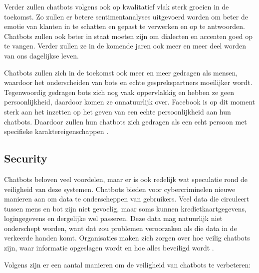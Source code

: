 Verder zullen chatbots volgens \textcite{Patel2020} ook op kwalitatief vlak sterk groeien in de toekomst. Zo zullen er betere sentimentanalyses uitgevoerd worden om beter de emotie van klanten in te schatten en gepast te verwerken en op te antwoorden. Chatbots zullen ook beter in staat moeten zijn om dialecten en accenten goed op te vangen. Verder zullen ze in de komende jaren ook meer en meer deel worden van ons dagelijkse leven.  

Chatbots zullen zich in de toekomst ook meer en meer gedragen als mensen, waardoor het onderscheiden van bots en echte gesprekspartners moeilijker wordt. Tegenwoordig gedragen bots zich nog vaak oppervlakkig en hebben ze geen persoonlijkheid, daardoor komen ze onnatuurlijk over. Facebook is op dit moment sterk aan het inzetten op het geven van een echte persoonlijkheid aan hun chatbots. Daardoor zullen hun chatbots zich gedragen als een echt persoon met specifieke karaktereigenschappen \autocite{Carey-Simos2018}.

\subsection{Security}
\label{subsec:security}

Chatbots beloven veel voordelen, maar er is ook redelijk wat speculatie rond de veiligheid van deze systemen. Chatbots bieden voor cybercriminelen nieuwe manieren aan om data te onderscheppen van gebruikers. Veel data die circuleert tussen mens en bot zijn niet gevoelig, maar soms kunnen kredietkaartgegevens, logingegevens en dergelijke wel passeren. Deze data mag natuurlijk niet onderschept worden, want dat zou problemen veroorzaken als die data in de verkeerde handen komt. Organisaties maken zich zorgen over hoe veilig chatbots zijn, waar informatie opgeslagen wordt en hoe alles beveiligd wordt \autocite{Shanbhag2018}.


Volgens \textcite{Shanbhag2018} zijn er een aantal manieren om de veiligheid van chatbots te verbeteren:

